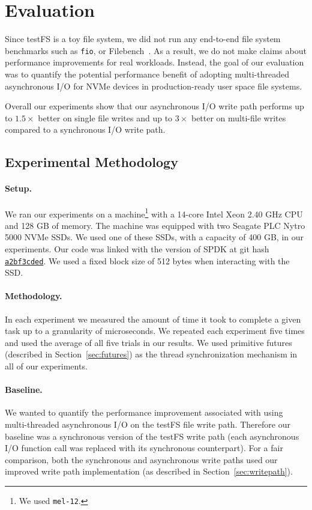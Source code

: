 \section{Evaluation}
Since testFS is a toy file system, we did not run any end-to-end file system
benchmarks such as {\tt fio}, or Filebench~\cite{filebench-tarasov16}. As a
result, we do not make claims about performance improvements for real
workloads. Instead, the goal of our evaluation was to quantify the potential
performance benefit of adopting multi-threaded asynchronous I/O for NVMe
devices in production-ready user space file systems.

Overall our experiments show that our asynchronous I/O write path performs up
to $1.5\times$ better on single file writes and up to $3\times$ better on
multi-file writes compared to a synchronous I/O write path.

\subsection{Experimental Methodology}
\paragraph{Setup.}
We ran our experiments on a machine\footnote{We used {\tt mel-12}.} with a
14-core Intel Xeon 2.40 GHz CPU and 128 GB of memory. The machine was equipped
with two Seagate PLC Nytro 5000 NVMe SSDs. We used one of these SSDs, with a
capacity of 400 GB, in our experiments. Our code was linked with the version of
SPDK at git hash
\href{https://github.com/spdk/spdk/commit/a2bf3cded37b7cc7e402eae80da90891f921b56d}{\tt a2bf3cded}.
We used a fixed block size of 512 bytes when interacting with the SSD.

\paragraph{Methodology.}
In each experiment we measured the amount of time it took to complete a given
task up to a granularity of microseconds. We repeated each experiment five
times and used the average of all five trials in our results. We used primitive
futures (described in Section~\ref{sec:futures}) as the thread synchronization
mechanism in all of our experiments.

\paragraph{Baseline.}
We wanted to quantify the performance improvement associated with using
multi-threaded asynchronous I/O on the testFS file write path. Therefore
our baseline was a synchronous version of the testFS write path (each
asynchronous I/O function call was replaced with its synchronous counterpart).
For a fair comparison, both the synchronous and asynchronous write paths used
our improved write path implementation (as described in
Section~\ref{sec:writepath}).

